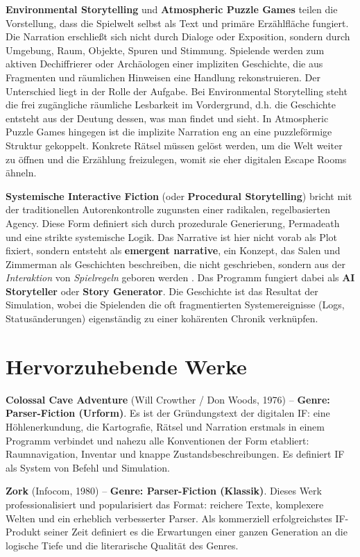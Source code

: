 \documentclass[parskip=half,a4paper,11pt]{scrreprt}
\begin{document}
\textbf{Environmental Storytelling} und \textbf{Atmospheric Puzzle Games} teilen die Vorstellung, dass die Spielwelt selbst als Text und primäre Erzählfläche fungiert. Die Narration erschließt sich nicht durch Dialoge oder Exposition, sondern durch Umgebung, Raum, Objekte, Spuren und Stimmung. Spielende werden zum aktiven Dechiffrierer oder Archäologen einer impliziten Geschichte, die aus Fragmenten und räumlichen Hinweisen eine Handlung rekonstruieren. Der Unterschied liegt in der Rolle der Aufgabe. Bei Environmental Storytelling steht die frei zugängliche räumliche Lesbarkeit im Vordergrund, d.h. die Geschichte entsteht aus der Deutung dessen, was man findet und sieht. In Atmospheric Puzzle Games hingegen ist die implizite Narration eng an eine puzzleförmige Struktur gekoppelt. Konkrete Rätsel müssen gelöst werden, um die Welt weiter zu öffnen und die Erzählung freizulegen, womit sie eher digitalen Escape Rooms ähneln.

\textbf{Systemische Interactive Fiction} (oder \textbf{Procedural Storytelling}) bricht mit der traditionellen Autorenkontrolle zugunsten einer radikalen, regelbasierten Agency. Diese Form definiert sich durch prozedurale Generierung, Permadeath und eine strikte systemische Logik. Das Narrative ist hier nicht vorab als Plot fixiert, sondern entsteht als \textbf{emergent narrative}, ein Konzept, das Salen und Zimmerman als Geschichten beschreiben, die nicht geschrieben, sondern aus der \textit{Interaktion} von \textit{Spielregeln} geboren werden \citep{Salen2004}. Das Programm fungiert dabei als \textbf{AI Storyteller} oder \textbf{Story Generator}. Die Geschichte ist das Resultat der Simulation, wobei die Spielenden die oft fragmentierten Systemereignisse (Logs, Statusänderungen) eigenständig zu einer kohärenten Chronik verknüpfen.

\section{Hervorzuhebende Werke}

\textbf{Colossal Cave Adventure} (Will Crowther / Don Woods, 1976) – \textbf{Genre: Parser-Fiction (Urform)}. Es ist der Gründungstext der digitalen IF: eine Höhlenerkundung, die Kartografie, Rätsel und Narration erstmals in einem Programm verbindet und nahezu alle Konventionen der Form etabliert: Raumnavigation, Inventar und knappe Zustandsbeschreibungen. Es definiert IF als System von Befehl und Simulation.

\textbf{Zork} (Infocom, 1980) – \textbf{Genre: Parser-Fiction (Klassik)}. Dieses Werk professionalisiert und popularisiert das Format: reichere Texte, komplexere Welten und ein erheblich verbesserter Parser. Als kommerziell erfolgreichstes IF-Produkt seiner Zeit definiert es die Erwartungen einer ganzen Generation an die logische Tiefe und die literarische Qualität des Genres.
\end{document}
